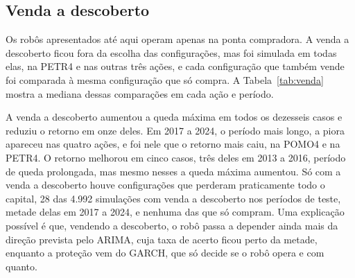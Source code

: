 \FloatBarrier
\subsection{Venda a descoberto}
\label{sec:venda}

Os robôs apresentados até aqui operam apenas na ponta compradora. A venda a
descoberto ficou fora da escolha das configurações, mas foi simulada em todas
elas, na PETR4 e nas outras três ações, e cada configuração que também vende foi
comparada à mesma configuração que só compra. A Tabela~\ref{tab:venda} mostra a
mediana dessas comparações em cada ação e período.

A venda a descoberto aumentou a queda máxima em todos os dezesseis casos e reduziu
o retorno em onze deles. Em 2017 a 2024, o período mais longo, a piora apareceu
nas quatro ações, e foi nele que o retorno mais caiu, na POMO4 e na PETR4. O
retorno melhorou em cinco casos, três deles em 2013 a 2016, período de queda
prolongada, mas mesmo nesses a queda máxima aumentou. Só com a venda a descoberto
houve configurações que perderam praticamente todo o capital, 28 das 4.992
simulações com venda a descoberto nos períodos de teste, metade delas em 2017 a
2024, e nenhuma das que só compram. Uma explicação possível é que, vendendo a
descoberto, o robô passa a depender ainda mais da direção prevista pelo ARIMA,
cuja taxa de acerto ficou perto da metade, enquanto a proteção vem do GARCH, que
só decide se o robô opera e com quanto.

